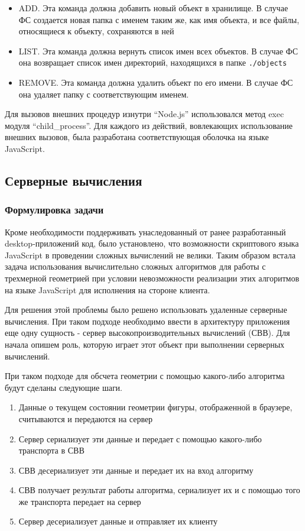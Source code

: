 \documentclass[12pt, a4paper]{article}
\begin{document}
\begin{itemize}
    \item ADD. Эта команда должна добавить новый объект в хранилище. В
    случае ФС создается новая папка с именем таким же, как имя объекта, и все
    файлы, относящиеся к объекту, сохраняются в ней
    \item LIST. Эта команда должна вернуть список имен всех объектов. В
    случае ФС она возвращает список имен директорий, находящихся в папке
    \texttt{./objects}
    \item REMOVE. Эта команда должна удалить объект по его имени. В случае
    ФС она удаляет папку с соответствующим именем.
\end{itemize}

Для вызовов внешних процедур изнутри ``Node.js'' использовался метод exec модуля
``child\_process''. Для каждого из действий, вовлекающих использование внешних
вызовов, была разработана соответствующая оболочка на языке JavaScript.

\subsection{Серверные вычисления}

\subsubsection{Формулировка задачи}

Кроме необходимости поддерживать унаследованный от ранее разработанный
desktop-приложений код, было установлено, что возможности скриптового языка
JavaScript в проведении сложных вычислений не велики. Таким образом встала
задача использования вычислительно сложных алгоритмов для работы с трехмерной
геометрией при условии невозможности реализации этих алгоритмов на языке
JavaScript для исполнения на стороне клиента.

Для решения этой проблемы было решено использовать удаленные серверные
вычисления. При таком подходе необходимо ввести в архитектуру приложения еще
одну сущность - сервер высокопроизводительных вычислений (СВВ). Для начала
опишем роль, которую играет этот объект при выполнении серверных вычислений.

При таком подходе для обсчета геометрии с помощью какого-либо алгоритма будут
сделаны следующие шаги.

\begin{enumerate}
    \item Данные о текущем состоянии геометрии фигуры, отображенной в браузере,
    считываются и передаются на сервер
    \item Сервер сериализует эти данные и передает с помощью какого-либо
    транспорта в СВВ
    \item СВВ десериализует эти данные и передает их на вход алгоритму
    \item СВВ получает результат работы алгоритма, сериализует их и с
    помощью того же транспорта передает на сервер
    \item Сервер десериализует данные и отправляет их клиенту
\end{enumerate}
\end{document}

